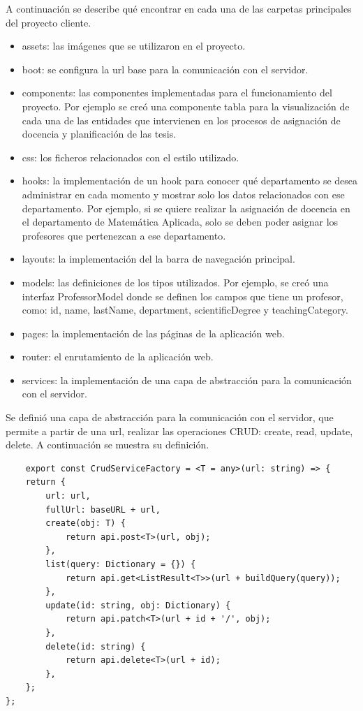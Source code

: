 A continuación se describe qué encontrar en cada una de las carpetas principales del proyecto
cliente.

\begin{itemize}
    \item assets: las imágenes que se utilizaron en el proyecto.
    \item boot: se configura la url base para la comunicación con el servidor. 
    \item components: las componentes implementadas para el funcionamiento del proyecto. 
    Por ejemplo se creó una componente tabla para la visualización de cada una de las entidades 
    que intervienen en los procesos de asignación de docencia y planificación de las tesis. 
    \item css: los ficheros relacionados con el estilo utilizado.
    \item hooks: la implementación de un hook para conocer qué departamento se desea administrar en cada momento 
    y mostrar solo los datos relacionados con ese departamento. Por ejemplo, si se quiere realizar la asignación de docencia en el 
    departamento de Matemática Aplicada, solo se deben poder asignar los profesores que pertenezcan a ese departamento.
    \item layouts: la implementación del la barra de navegación principal.
    \item models: las definiciones de los tipos utilizados. Por ejemplo, se creó una interfaz ProfessorModel donde se definen los 
    campos que tiene un profesor, como: id, name, lastName, department, scientificDegree y teachingCategory.  
    \item pages: la implementación de las páginas de la aplicación web.
    \item router: el enrutamiento de la aplicación web.
    \item services: la implementación de una capa de abstracción para la comunicación con el servidor.
\end{itemize}


Se definió una capa de abstracción para la comunicación con 
el servidor, que permite a partir de una url, realizar las operaciones CRUD: create, read, update, delete. 
A continuación se muestra su definición.

\begin{verbatim}
    export const CrudServiceFactory = <T = any>(url: string) => {
    return {
        url: url,
        fullUrl: baseURL + url,
        create(obj: T) {
            return api.post<T>(url, obj);
        },
        list(query: Dictionary = {}) {
            return api.get<ListResult<T>>(url + buildQuery(query));
        },
        update(id: string, obj: Dictionary) {
            return api.patch<T>(url + id + '/', obj);
        },
        delete(id: string) {
            return api.delete<T>(url + id);
        },
    };
};
\end{verbatim}


